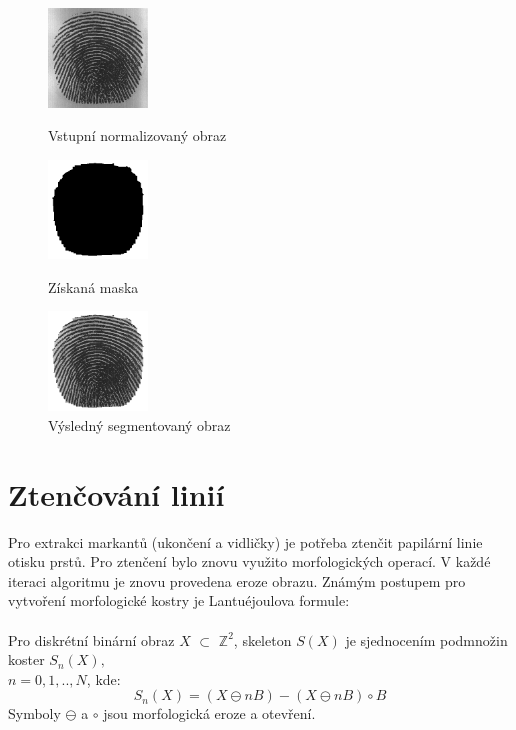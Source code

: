 \begin{figure}[htbp]
  \begin{minipage}[b]{0.3\linewidth}
    \centering
    \includegraphics[width=100px]{obrazky-figures/105_5norm.png}
    \caption{Vstupní normalizovaný obraz}
  \end{minipage}
  \hspace{0.3cm}
  \begin{minipage}[b]{0.3\linewidth}
    \centering
    \includegraphics[width=100px]{obrazky-figures/105_5mask.png}
    \caption{Získaná maska}
  \end{minipage}
  \hspace{0.3cm}
    \begin{minipage}[b]{0.3\linewidth}
    \centering
    \includegraphics[width=100px]{obrazky-figures/105_5segment.png}
    \caption{Výsledný segmentovaný obraz}
  \end{minipage}
\end{figure}

\section{Ztenčování linií}
Pro extrakci markantů (ukončení a vidličky) je potřeba ztenčit papilární linie otisku prstů. Pro ztenčení bylo znovu využito morfologických operací. V každé iteraci algoritmu je znovu provedena eroze obrazu.
Známým postupem pro vytvoření morfologické kostry je Lantuéjoulova formule:\cite{WikipediaSkeleton}\\\\
Pro diskrétní binární obraz $X$ $\subset$ $\mathds{Z}^2$, skeleton $S(X)$ je sjednocením podmnožin koster ${S_n(X)},$\\$ n = 0,1,..,N$, kde:
$$S_n(X) = (X \ominus nB) - (X \ominus nB) \circ B$$ Symboly $\ominus$ a $\circ$ jsou morfologická eroze a otevření. 

